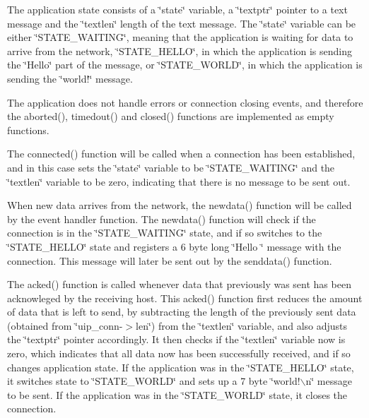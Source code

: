 \-The application state consists of a \char`\"{}state\char`\"{} variable, a \char`\"{}textptr\char`\"{} pointer to a text message and the \char`\"{}textlen\char`\"{} length of the text message. \-The \char`\"{}state\char`\"{} variable can be either \char`\"{}\-S\-T\-A\-T\-E\-\_\-\-W\-A\-I\-T\-I\-N\-G\char`\"{}, meaning that the application is waiting for data to arrive from the network, \char`\"{}\-S\-T\-A\-T\-E\-\_\-\-H\-E\-L\-L\-O\char`\"{}, in which the application is sending the \char`\"{}\-Hello\char`\"{} part of the message, or \char`\"{}\-S\-T\-A\-T\-E\-\_\-\-W\-O\-R\-L\-D\char`\"{}, in which the application is sending the \char`\"{}world!\char`\"{} message.

\-The application does not handle errors or connection closing events, and therefore the aborted(), timedout() and closed() functions are implemented as empty functions.

\-The connected() function will be called when a connection has been established, and in this case sets the \char`\"{}state\char`\"{} variable to be \char`\"{}\-S\-T\-A\-T\-E\-\_\-\-W\-A\-I\-T\-I\-N\-G\char`\"{} and the \char`\"{}textlen\char`\"{} variable to be zero, indicating that there is no message to be sent out.

\-When new data arrives from the network, the newdata() function will be called by the event handler function. \-The newdata() function will check if the connection is in the \char`\"{}\-S\-T\-A\-T\-E\-\_\-\-W\-A\-I\-T\-I\-N\-G\char`\"{} state, and if so switches to the \char`\"{}\-S\-T\-A\-T\-E\-\_\-\-H\-E\-L\-L\-O\char`\"{} state and registers a 6 byte long \char`\"{}\-Hello
\char`\"{} message with the connection. \-This message will later be sent out by the senddata() function.

\-The acked() function is called whenever data that previously was sent has been acknowleged by the receiving host. \-This acked() function first reduces the amount of data that is left to send, by subtracting the length of the previously sent data (obtained from \char`\"{}uip\-\_\-conn-\/$>$len\char`\"{}) from the \char`\"{}textlen\char`\"{} variable, and also adjusts the \char`\"{}textptr\char`\"{} pointer accordingly. \-It then checks if the \char`\"{}textlen\char`\"{} variable now is zero, which indicates that all data now has been successfully received, and if so changes application state. \-If the application was in the \char`\"{}\-S\-T\-A\-T\-E\-\_\-\-H\-E\-L\-L\-O\char`\"{} state, it switches state to \char`\"{}\-S\-T\-A\-T\-E\-\_\-\-W\-O\-R\-L\-D\char`\"{} and sets up a 7 byte \char`\"{}world!$\backslash$n\char`\"{} message to be sent. \-If the application was in the \char`\"{}\-S\-T\-A\-T\-E\-\_\-\-W\-O\-R\-L\-D\char`\"{} state, it closes the connection.

